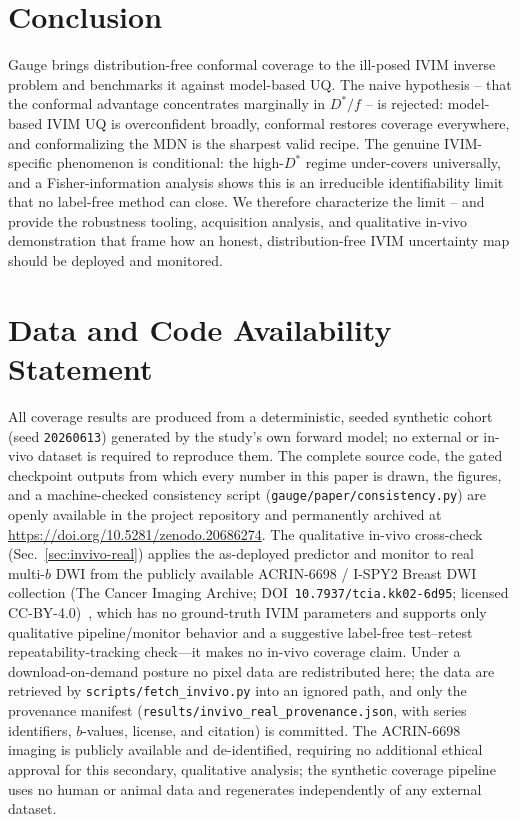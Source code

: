 \documentclass[11pt]{article}
\newcommand{\Dstar}{D^{*}}
\begin{document}
\section{Conclusion}
Gauge brings distribution-free conformal coverage to the ill-posed IVIM inverse
problem and benchmarks it against model-based UQ. The naive hypothesis -- that the
conformal advantage concentrates marginally in $\Dstar/f$ -- is rejected:
model-based IVIM UQ is overconfident broadly, conformal restores coverage
everywhere, and conformalizing the MDN is the sharpest valid recipe. The genuine
IVIM-specific phenomenon is conditional: the high-$\Dstar$ regime under-covers
universally, and a Fisher-information analysis shows this is an irreducible
identifiability limit that no label-free method can close. We therefore characterize
the limit -- and provide the robustness tooling, acquisition analysis, and
qualitative in-vivo demonstration that frame how an honest, distribution-free IVIM
uncertainty map should be deployed and monitored.

\section*{Data and Code Availability Statement}
All coverage results are produced from a deterministic, seeded synthetic cohort
(seed \texttt{20260613}) generated by the study's own forward model; no external or
in-vivo dataset is required to reproduce them. The complete source code, the gated
checkpoint outputs from which every number in this paper is drawn, the figures, and
a machine-checked consistency script (\texttt{gauge/paper/consistency.py}) are
openly available in the project repository and permanently archived at
\href{https://doi.org/10.5281/zenodo.20686274}{https://doi.org/10.5281/zenodo.20686274}.
The qualitative in-vivo cross-check (Sec.~\ref{sec:invivo-real}) applies the
as-deployed predictor and monitor to real multi-$b$ DWI from the publicly available
ACRIN-6698 / I-SPY2 Breast DWI collection (The Cancer Imaging Archive;
DOI~\texttt{10.7937/tcia.kk02-6d95}; licensed CC-BY-4.0)~\cite{acrin6698,clark2013tcia},
which has no ground-truth IVIM parameters and supports only qualitative
pipeline/monitor behavior and a suggestive label-free test--retest
repeatability-tracking check---it makes no in-vivo coverage claim. Under a
download-on-demand posture no pixel data are redistributed here; the data are
retrieved by \texttt{scripts/fetch\_invivo.py} into an ignored path, and only the
provenance manifest (\texttt{results/invivo\_real\_provenance.json}, with series
identifiers, $b$-values, license, and citation) is committed. The ACRIN-6698 imaging
is publicly available and de-identified, requiring no additional ethical approval for
this secondary, qualitative analysis; the synthetic coverage pipeline uses no human
or animal data and regenerates independently of any external dataset.
\end{document}
